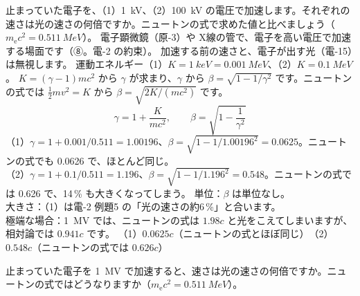 \label{ph:原-11:ex8}
\begin{phreidai}[電圧で加速した電子の速さ]
止まっていた電子を、（1）\qty{1}{kV}、（2）\qty{100}{kV} の電圧で加速します。それぞれの速さは光の速さの何倍ですか。ニュートンの式で求めた値と比べましょう（$m_{\mathrm e}c^2=\qty{0.511}{MeV}$）。
\phbamen
電子顕微鏡（原-3）や X線の管で、電子を高い電圧で加速する場面です（⑧。電-2 の約束）。
\phmushi
加速する前の速さと、電子が出す光（電-15）は無視します。
\phzu
運動エネルギー（1）$K=\qty{1}{keV}=\qty{0.001}{MeV}$、（2）$K=\qty{0.1}{MeV}$。
\phriyu
$K=(\gamma-1)mc^2$ から $\gamma$ が求まり、$\gamma$ から $\beta=\sqrt{1-1/\gamma^2}$ です。ニュートンの式では $\tfrac12mv^2=K$ から $\beta=\sqrt{2K/(mc^2)}$ です。
\phtateru
\[ \gamma=1+\frac{K}{mc^2},\qquad\beta=\sqrt{1-\frac{1}{\gamma^2}} \]
\phtoku
（1）$\gamma=1+0.001/0.511=1.00196$、$\beta=\sqrt{1-1/1.00196^2}=0.0625$。ニュートンの式でも 0.0626 で、ほとんど同じ。\\
（2）$\gamma=1+0.1/0.511=1.196$、$\beta=\sqrt{1-1/1.196^2}=0.548$。ニュートンの式では 0.626 で、14\,\% も大きくなってしまう。
\phtashikame
単位：$\beta$ は単位なし。\\
大きさ：（1）は電-2 例題5 の「光の速さの約6\,\%」と合います。\\
極端な場合：\qty{1}{MV} では、ニュートンの式は $1.98c$ と光をこえてしまいますが、相対論では $0.941c$ です。
\kotae （1）$0.0625c$（ニュートンの式とほぼ同じ）　（2）$0.548c$（ニュートンの式では $0.626c$）
\end{phreidai}
\begin{jibun}
止まっていた電子を \qty{1}{MV} で加速すると、速さは光の速さの何倍ですか。ニュートンの式ではどうなりますか（$m_{\mathrm e}c^2=\qty{0.511}{MeV}$）。
\end{jibun}

